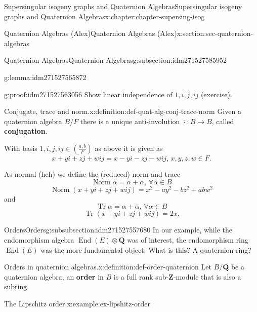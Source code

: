 \documentclass[oneside,10pt,]{book}
\newcommand{\terminology}[1]{\textbf{#1}}
\numberwithin{equation}{section}
\newcommand{\legendre}[2]{\left(\frac{#1}{#2}\right)}
\newcommand{\ZZ}{\mathbf{Z}}
\newcommand{\QQ}{\mathbf{Q}}
\DeclareMathOperator{\End}{End}
\DeclareMathOperator{\norm}{Norm}
\DeclareMathOperator{\trace}{Tr}
\begin{document}
\begin{chapterptx}{Supersingular isogeny graphs and Quaternion Algebras}{}{Supersingular isogeny graphs and Quaternion Algebras}{}{}{x:chapter:chapter-supersing-isog}
\begin{sectionptx}{Quaternion Algebras (Alex)}{}{Quaternion Algebras (Alex)}{}{}{x:section:sec-quaternion-algebras}
\begin{subsectionptx}{Quaternion Algebras}{}{Quaternion Algebras}{}{}{g:subsection:idm271527585952}
\begin{introduction}{}
\begin{lemma}{}{}{g:lemma:idm271527565872}
\end{lemma}
\begin{proofptx}{}{g:proof:idm271527563056}
Show linear independence of \(1,i,j,ij\) (exercise).%
\end{proofptx}
\begin{definition}{Conjugate, trace and norm.}{x:definition:def-quat-alg-conj-trace-norm}%
Given a quaternion algebra \(B/F\) there is a unique anti-involution \(\overline \cdot \colon B \to B\), called \terminology{conjugation}.%
\par
With basis \(1,i,j,ij\in \legendre{a,b}{F}\) as above it is given as%
\begin{equation*}
\overline {x + yi + zj + w ij} = x - yi - zj - w ij,\,x,y,z,w\in F\text{.}
\end{equation*}
%
\par
As normal (heh) we define the (reduced) norm and trace%
\begin{equation*}
\norm \alpha =  \alpha + \overline \alpha,\,\forall \alpha \in B
\end{equation*}
%
\begin{equation*}
\norm(x + yi + zj + w ij) = x^2 - ay^2 - b z^2 + ab w^2
\end{equation*}
and%
\begin{equation*}
\trace \alpha =  \alpha + \overline \alpha,\,\forall \alpha \in B
\end{equation*}
%
\begin{equation*}
\trace (x + yi + zj + w ij) = 2x\text{.}
\end{equation*}
%
\end{definition}
\end{introduction}%
%
%
\typeout{************************************************}
\typeout{************************************************}
%
\begin{subsubsectionptx}{Orders}{}{Orders}{}{}{g:subsubsection:idm271527557680}
In our example, while the endomorphism algebra \(\End(E)\otimes \QQ\) was of interest, the endomorphism ring \(\End(E)\) was the more fundamental object. What is this? A quaternion ring?%
\begin{definition}{Orders in quaternion algebras.}{x:definition:def-order-quaternion}%
Let \(B/\QQ\) be a quaternion algebra, an \terminology{order} in \(B\) is a full rank sub-\(\ZZ\)-module that is also a subring.%
\end{definition}
\begin{example}{The Lipschitz order.}{x:example:ex-lipshitz-order}%

\end{example}
\end{subsubsectionptx}
\end{subsectionptx}
\end{sectionptx}
\end{chapterptx}
\end{document}
